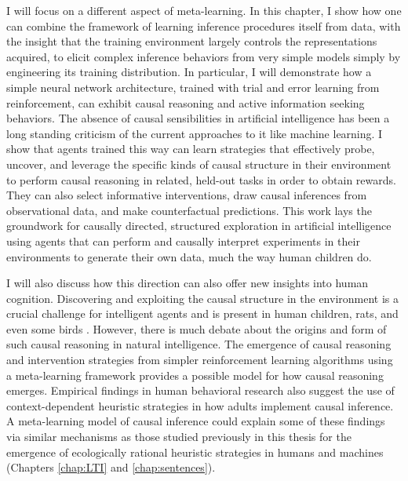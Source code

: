 I will focus on a different aspect of meta-learning. In this chapter, I show how one can combine the framework of learning inference procedures itself from data, with the insight that the training environment largely controls the representations acquired, to elicit complex inference behaviors from very simple models simply by engineering its training distribution.\citep{dasgupta2019causal} In particular, I will demonstrate how a simple neural network architecture, trained with trial and error learning from reinforcement, can exhibit causal reasoning and active information seeking behaviors. The absence of causal sensibilities in artificial intelligence has been a long standing criticism of the current approaches to it like machine learning. \citep{pearl88probabilistic, pearl2000} I show that agents trained this way can learn strategies that effectively probe, uncover, and leverage the specific kinds of causal structure in their environment to perform causal reasoning in related, held-out tasks in order to obtain rewards. They can also select informative interventions, draw causal inferences from observational data, and make counterfactual predictions. This work lays the groundwork for causally directed, structured exploration in artificial intelligence using agents that can perform and causally interpret experiments in their environments to generate their own data, much the way human children do\citep{gureckis2012self}.

I will also discuss how this direction can also offer new insights into human cognition. Discovering and exploiting the causal structure in the environment is a crucial challenge for intelligent agents and is present in human children, rats, and even some birds \citep{leslie1982perception,gopnik2001causal,gopnik2004theory,blaisdell2006causal, lagnado2013causal}. However, there is much debate about the origins and form of such causal reasoning in natural intelligence\citep{waldmann2013causal, cartwright2004causation}. The emergence of causal reasoning and intervention strategies from simpler reinforcement learning algorithms using a meta-learning framework provides a possible model for how causal reasoning emerges. Empirical findings in human behavioral research also suggest the use of context-dependent heuristic strategies in how adults implement causal inference. A meta-learning model of causal inference could explain some of these findings via similar mechanisms as those studied previously in this thesis for the emergence of ecologically rational heuristic strategies in humans and machines (Chapters \ref{chap:LTI} and \ref{chap:sentences}).

